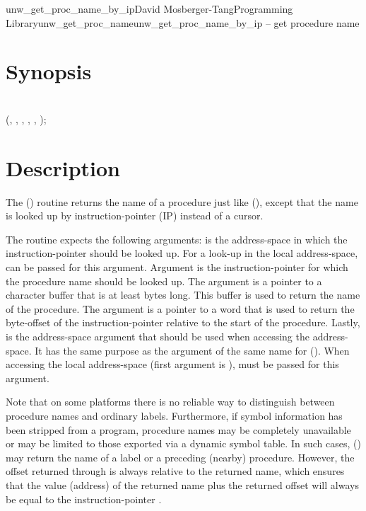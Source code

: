 \documentclass{article}
\begin{document}
\begin{Name}{3}{unw\_get\_proc\_name\_by\_ip}{David Mosberger-Tang}{Programming Library}{unw\_get\_proc\_name}unw\_get\_proc\_name\_by\_ip -- get procedure name
\end{Name}

\section{Synopsis}

\\

 (, , ,  , , );\\

\section{Description}

The () routine returns the name of
a procedure just like (), except that the
name is looked up by instruction-pointer (IP) instead of a cursor.

The routine expects the following arguments:  is the
address-space in which the instruction-pointer should be looked up.
For a look-up in the local address-space,
 can be passed for this argument.
Argument  is the instruction-pointer for which the procedure
name should be looked up.  The  argument is a pointer to
a character buffer that is at least  bytes long.  This buffer
is used to return the name of the procedure.  The  argument
is a pointer to a word that is used to return the byte-offset of the
instruction-pointer relative to the start of the procedure.
Lastly,  is the address-space argument that should be used
when accessing the address-space.  It has the same purpose as the
argument of the same name for ().  When
accessing the local address-space (first argument is
),  must be passed for this
argument.

Note that on some platforms there is no reliable way to distinguish
between procedure names and ordinary labels.  Furthermore, if symbol
information has been stripped from a program, procedure names may be
completely unavailable or may be limited to those exported via a
dynamic symbol table.  In such cases,
() may return the name of a label
or a preceding (nearby) procedure.  However, the offset returned
through  is always relative to the returned name, which
ensures that the value (address) of the returned name plus the
returned offset will always be equal to the instruction-pointer
.
\end{document}
